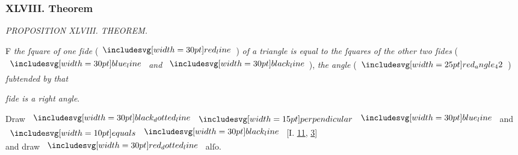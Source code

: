 \documentclass[11pt,preview]{standalone}
\begin{document}
\subsubsection{XLVIII. Theorem}

\begin{minipage}[t]{0.55\textwidth}
    \begin{center}
        \textit{PROPOSITION XLVIII. THEOREM.}\label{book1pr48} \\
    \end{center}

    \hfill

    \begin{center}
        \raggedright \lettrine[lines=3, loversize=1, nindent=0pt]{}{}F \textit{the ſquare of one ſide} (\hspace{-1ex}$\redline$\hspace{-1ex}) \textit{of a triangle is equal to the ſquares of the other two ſides} (\hspace{-1ex}$\blueline$ \textit{and} $\blackline$\hspace{-1ex}), \textit{the angle} (\hspace{-1ex}$\img{red_angle_42}$\hspace{-1ex}) \textit{ſubtended by that}
    \end{center}
    \textit{ſide is a right angle}.
\end{minipage}%
\hfill
\begin{minipage}[t]{0.43\textwidth}
    \vspace{20pt}
    
\end{minipage}%

\hfill

{\vspace{1ex}\begin{center}
        Draw $\dottedblackline \bperp \blueline$ and $\bequals \blackline$ [\textsc{I.} \hyperref[book1pr11]{11}, \hyperref[book1pr3]{3}]\\
        and draw $\dottedredline$ alſo.
    \end{center}}

\hfill
\end{document}
